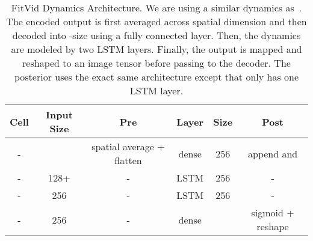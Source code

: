 \documentclass{article}
\newcommand{\model}{FitVid\xspace}
\begin{document}
\begin{table}[!htp]\centering
\caption{\model Dynamics Architecture. We are using a similar dynamics as~\citet{denton2018stochastic}. The encoded output is first averaged across spatial dimension and then decoded into -size using a fully connected layer. Then, the dynamics are modeled by two LSTM layers. Finally, the output is mapped and reshaped to an image tensor before passing to the decoder. The posterior uses the exact same architecture except that only has one LSTM layer.}
\label{tab:poster}
\scriptsize
\begin{tabular}{cccccc}\toprule
Cell &Input Size &Pre &Layer &Size &Post\\\midrule
- & &spatial average + flatten &dense &256 &append  and  \\
- &128+ & - &LSTM &256 &- \\
- &256 & - &LSTM &256 &- \\
- &256 & - &dense & &sigmoid + reshape \\
\bottomrule
\end{tabular}
\end{table}
\end{document}
